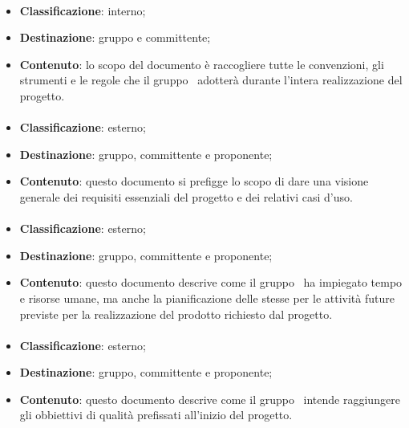 			\paragraph{\NdP}
			\begin{itemize}
				\item \textbf{Classificazione}: interno;
				\item \textbf{Destinazione}: gruppo e committente;
				\item \textbf{Contenuto}: lo scopo del documento è raccogliere tutte le convenzioni, gli strumenti e le regole che il gruppo \gruppo\ adotterà durante l'intera realizzazione del progetto. 
			\end{itemize}	

			\paragraph{\AdR}
			\begin{itemize}
				\item \textbf{Classificazione}: esterno;
				\item \textbf{Destinazione}: gruppo, committente e proponente;
				\item \textbf{Contenuto}: questo documento si prefigge lo scopo di dare una visione generale dei requisiti essenziali del progetto e dei relativi casi d'uso.
			\end{itemize}

			\paragraph{\PdP}
			\begin{itemize}
				\item \textbf{Classificazione}: esterno;
				\item \textbf{Destinazione}: gruppo, committente e proponente;
				\item \textbf{Contenuto}: questo documento descrive come il gruppo \gruppo\ ha impiegato tempo e risorse umane, ma anche la pianificazione delle stesse per le attività future previste per la realizzazione del prodotto richiesto dal progetto.
			\end{itemize}

			\paragraph{\PdQ}
			\begin{itemize}
				\item \textbf{Classificazione}: esterno;
				\item \textbf{Destinazione}: gruppo, committente e proponente;
				\item \textbf{Contenuto}: questo documento descrive come il gruppo \gruppo\ intende raggiungere gli obbiettivi di qualità prefissati all’inizio del progetto.
			\end{itemize}

